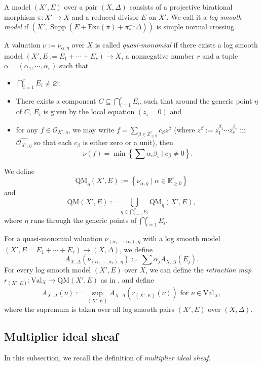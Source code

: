 \documentclass[a4paper,12pt]{amsart}
\theoremstyle{definition} %
\theoremstyle{remark}
\numberwithin{equation}{section}
\newcommand{\R}{\mathbb{R}}
\newcommand{\Z}{\mathbb{Z}}
\def\Supp{\operatorname{Supp}}
\begin{document}
\smallskip

A model $(X',E)$ over a pair $(X,\Delta)$ consists of a projective birational morphism $\pi:X'\to X$ and a reduced divisor $E$ on $X'$. We call it a \emph{log smooth model} if $(X',\Supp(E+\mathrm{Exc}(\pi)+\pi^{-1}_*\Delta))$ is simple normal crossing.

\smallskip

A valuation $\nu:=\nu_{\alpha,\eta}$ over $X$ is called \emph{quasi-monomial} if there exists a log smooth model $(X',E:=E_1+\cdots+E_r)\to X$, a nonnegative number $r$ and a tuple $\alpha=(\alpha_1,\cdots,\alpha_r)$ such that
\begin{itemize}
    \item[(1)] $\bigcap^r_{i=1}E_i\ne \varnothing$;
    \item[(2)] There exists a component $C\subseteq \bigcap^r_{i=1}E_i$, such that around the generic point $\eta$ of $C$, $E_i$ is given by the local equation $(z_i=0)$ and
    \item[(3)] for any $f\in \mathcal{O}_{X',\eta}$, we may write $f=\sum_{\beta\in \Z^r_{\ge 0}}c_{\beta}z^{\beta}$ (where $z^{\beta}:=z^{\beta_1}_1\cdots z^{\beta_r}_r$ in $\widehat{\mathcal{O}_{X',\eta}}$ so that each $c_{\beta}$ is either zero or a unit), then
    $$ \nu(f)=\min\left\{\sum \alpha_i\beta_i\mid c_{\beta}\ne 0\right\}.$$
\end{itemize}
We define
$$ \mathrm{QM}_{\eta}(X',E):=\left\{\nu_{\alpha,\eta}\mid \alpha\in \R^r_{\ge 0}\right\}  $$
and
$$ \mathrm{QM}(X',E):=\bigcup_{\eta \in \bigcap^r_{i=1} E_i}\mathrm{QM}_{\eta}(X',E), $$
where $\eta$ runs through the generic points of $\bigcap^r_{i=1}E_i$.

\smallskip

For a quasi-monomial valuation $\nu_{(\alpha_1,\cdots,\alpha_r),\eta}$ with a log smooth model $(X',E=E_1+\cdots+E_r)\to (X,\Delta)$, we define
$$ A_{X,\Delta}(\nu_{(\alpha_1,\cdots,\alpha_r),\eta}):=\sum \alpha_j A_{X,\Delta}(E_j).$$
For every log smooth model $(X',E)$ over $X$, we can define the \emph{retraction map} $r_{(X',E)}:\mathrm{Val}_X\to \mathrm{QM}(X',E)$ as in \cite[4.3]{JM12}, and define
$$ A_{X,\Delta}(\nu):=\sup_{(X',E)}A_{X,\Delta}(r_{(X',E)}(\nu))\text{ for }\nu\in \mathrm{Val}_X,$$
where the supremum is taken over all log smooth pairs $(X',E)$ over $(X,\Delta)$.

\subsection{Multiplier ideal sheaf}
In this subsection, we recall the definition of \emph{multiplier ideal sheaf}.
\end{document}
